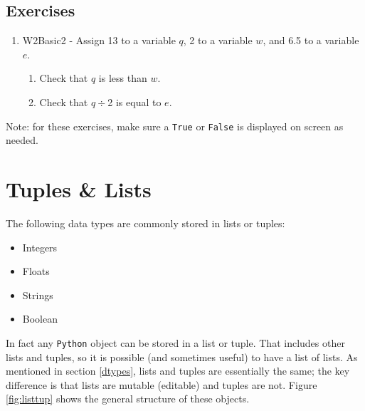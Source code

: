 \newpage

\subsection{Exercises}

\begin{enumerate}
\item W2Basic2 - Assign 13 to a variable $q$, 2 to a variable $w$, and 6.5 to a variable $e$.
\begin{enumerate}
      \item Check that $q$ is less than $w$.
      \item Check that $q\div$2 is equal to $e$.
\end{enumerate}
\end{enumerate}
\noindent Note: for these exercises, make sure a {\tt True} or {\tt False} is displayed on screen as needed.\\

\section{Tuples \& Lists}
The following data types are commonly stored in lists or tuples:
\begin{itemize}
    \item Integers
    \item Floats
    \item Strings
    \item Boolean
\end{itemize}

\noindent In fact any \texttt{Python} object can be stored in a list or tuple. That includes other lists and tuples, so it is possible (and sometimes useful) to have a list of lists. As mentioned in section \ref{dtypes}, lists and tuples are essentially the same; the key difference is that lists are mutable (editable) and tuples are not. Figure \ref{fig:listtup} shows the general structure of these objects. 

